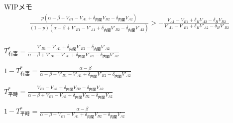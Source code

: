 \documentclass[main.tex]{subfiles}
\begin{document}
\newpage
WIPメモ
\begin{align*}
    \frac{ p( \alpha-\beta + V_{B1}-V_{A1} + \delta_{内閣}V_{B2} - \delta_{内閣}V_{A2} ) }{ (1-p)( \alpha-\beta + V'_{B1}-V'_{A1} + \delta_{内閣}V'_{B2} - \delta_{内閣}V'_{A2} ) }    >    - \frac{ V_{A1} - V_{B1} + \delta_H V_{A2} - \delta_H V_{B2} }{ V'_{A1} -V'_{B1} + \delta_H V'_{A2} - \delta_H V'_{B2} } \\[1em]
\end{align*}




\begin{definition} \Large$T^*_{有事} = \frac{ V'_{B1} - V'_{A1} +\delta_{内閣}V'_{B2} - \delta_{内閣}V'_{A2} }{ \alpha-\beta + V'_{B1}-V'_{A1} + \delta_{内閣}V'_{B2} - \delta_{内閣}V'_{A2} }$ \end{definition}

\begin{definition} \Large$1 - T^*_{有事} = \frac{ \alpha-\beta }{ \alpha-\beta + V'_{B1}-V'_{A1} + \delta_{内閣}V'_{B2} - \delta_{内閣}V'_{A2} }$ \end{definition}


\begin{definition} \Large$T^*_{平時} = \frac{ V_{B1} - V_{A1} +\delta_{内閣}V_{B2} - \delta_{内閣}V_{A2} }{ \alpha-\beta + V_{B1}-V_{A1} + \delta_{内閣}V_{B2} - \delta_{内閣}V_{A2} }$ \end{definition}

\begin{definition} \Large$1 - T^*_{平時} = \frac{ \alpha-\beta }{ \alpha-\beta + V_{B1}-V_{A1} + \delta_{内閣}V_{B2} - \delta_{内閣}V_{A2} }$ \end{definition}





\theendnotes
\end{document}

